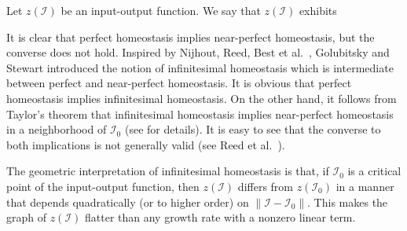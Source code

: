 \documentclass[a4paper,fleqn]{cas-dc}
\newcommand{\II}{{\mathcal I}}
\newcommand{\END}{\hfill\mbox{\raggedright \mbox{\raisebox{2pt}{\scalebox{0.6}{$\Diamond$}}}}\medskip}
\newcommand{\etal}{\textrm{et al.}}
\begin{document}
\begin{definition} \label{D:inf_homeo}
Let $z(\II)$ be an input-output function.
We say that $z(\II)$ exhibits
\end{definition}

It is clear that perfect homeostasis implies near-perfect homeostasis, but the converse does not hold.  
Inspired by Nijhout, Reed, Best \etal~\cite{nrbu2004,best2009,nbr2014}, Golubitsky and Stewart \cite{gs2017,gs2018} introduced the notion of infinitesimal homeostasis which is intermediate between perfect and near-perfect homeostasis.
It is obvious that perfect homeostasis implies infinitesimal homeostasis. 
On the other hand, it follows from Taylor's theorem that infinitesimal homeostasis implies near-perfect homeostasis in a neighborhood of $\II_0$ (see \cite{gs2023} for details).
It is easy to see that the converse to both implications is not generally valid (see Reed \etal~\cite{rbgsn2017}).

The geometric interpretation of infinitesimal homeostasis is that, if $\II_0$ is a critical point of the input-output function, then $z(\II)$ differs from $z(\II_0)$ in a manner that depends quadratically (or to higher order) on $\|\II-\II_0\|$. This makes the graph of $z(\II)$ flatter than any growth rate with a nonzero linear term.
\end{document}
